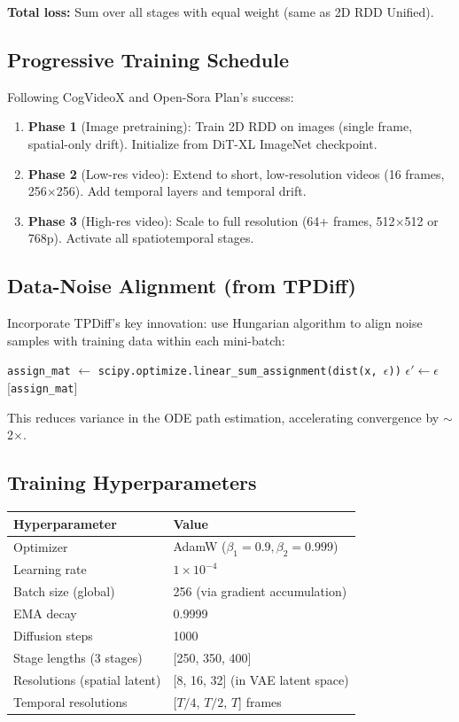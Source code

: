 \documentclass[11pt,a4paper]{article}
\begin{document}
\textbf{Total loss:} Sum over all stages with equal weight (same as 2D RDD Unified).

\subsection{Progressive Training Schedule}

Following CogVideoX and Open-Sora Plan's success:
\begin{enumerate}[nosep]
\item \textbf{Phase 1} (Image pretraining): Train 2D RDD on images (single frame, spatial-only drift). Initialize from DiT-XL ImageNet checkpoint.
\item \textbf{Phase 2} (Low-res video): Extend to short, low-resolution videos (16 frames, 256$\times$256). Add temporal layers and temporal drift.
\item \textbf{Phase 3} (High-res video): Scale to full resolution (64+ frames, 512$\times$512 or 768p). Activate all spatiotemporal stages.
\end{enumerate}

\subsection{Data-Noise Alignment (from TPDiff)}

Incorporate TPDiff's key innovation: use Hungarian algorithm to align noise samples with training data within each mini-batch:
\begin{algorithmic}
\STATE \texttt{assign\_mat} $\leftarrow$ \texttt{scipy.optimize.linear\_sum\_assignment(dist(x, $\epsilon$))}
\STATE $\epsilon' \leftarrow \epsilon$[\texttt{assign\_mat}]
\end{algorithmic}
This reduces variance in the ODE path estimation, accelerating convergence by $\sim$2$\times$.

\subsection{Training Hyperparameters}

\begin{table}[h]
\centering
\begin{tabular}{ll}
\toprule
Hyperparameter & Value \\
\midrule
Optimizer & AdamW ($\beta_1=0.9, \beta_2=0.999$) \\
Learning rate & $1\times10^{-4}$ \\
Batch size (global) & 256 (via gradient accumulation) \\
EMA decay & 0.9999 \\
Diffusion steps & 1000 \\
Stage lengths (3 stages) & [250, 350, 400] \\
Resolutions (spatial latent) & [8, 16, 32] (in VAE latent space) \\
Temporal resolutions & [$T/4$, $T/2$, $T$] frames \\
\bottomrule
\end{tabular}
\end{table}
\end{document}

